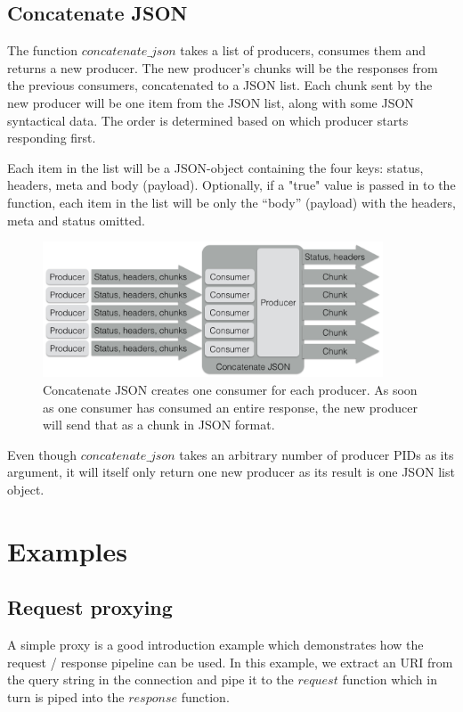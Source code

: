 \documentclass{cslthse-msc}
\begin{document}
\subsection{Concatenate JSON}
The function $concatenate\_json$ takes a list of producers, consumes them and returns a new producer. The new producer's chunks will be the responses from the previous consumers, concatenated to a JSON list. Each chunk sent by the new producer will be one item from the JSON list, along with some JSON syntactical data. The order is determined based on which producer starts responding first.

Each item in the list will be a JSON-object containing the four keys: status, headers, meta and body (payload). Optionally, if a "true" value is passed in to the function, each item in the list will be only the \enquote{body} (payload) with the headers, meta and status omitted.


\begin{figure}[H]
  \centering
    \begin{center}
      \includegraphics[width=0.9\textwidth]{images/crocpear_concatenate_json.png}
    \end{center}
  \caption{Concatenate JSON creates one consumer for each producer. As soon as one consumer has consumed an entire response, the new producer will send that as a chunk in JSON format.}
\end{figure}

Even though $concatenate\_json$ takes an arbitrary number of producer PIDs as its argument, it will itself only return one new producer as its result is one JSON list object.

\section{Examples}
\subsection{Request proxying}
A simple proxy is a good introduction example which demonstrates how the request / response pipeline can be used. In this example, we extract an URI from the query string in the connection and pipe it to the $request$ function which in turn is piped into the $response$ function.
\end{document}
